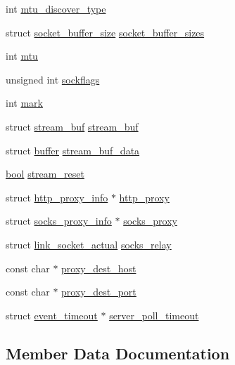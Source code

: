 \begin{DoxyCompactItemize}
\item 
int \hyperlink{structlink__socket_a9968fc78504a49c861a0deedc1f5df3c}{mtu\+\_\+discover\+\_\+type}
\item 
struct \hyperlink{structsocket__buffer__size}{socket\+\_\+buffer\+\_\+size} \hyperlink{structlink__socket_a30f2a6730a458002824a902bdff9b539}{socket\+\_\+buffer\+\_\+sizes}
\item 
int \hyperlink{structlink__socket_a78e016494e8d48f1f752808d5fa2533d}{mtu}
\item 
unsigned int \hyperlink{structlink__socket_aa5cbf92dc691f9e3b1a460f1f1e290b4}{sockflags}
\item 
int \hyperlink{structlink__socket_a7e6126e013970d898982b4c2c939dd88}{mark}
\item 
struct \hyperlink{structstream__buf}{stream\+\_\+buf} \hyperlink{structlink__socket_aadfcc653c136bad2c174066f4ff5b799}{stream\+\_\+buf}
\item 
struct \hyperlink{structbuffer}{buffer} \hyperlink{structlink__socket_acf50c66913a5c334fa9e7443a6dcc62f}{stream\+\_\+buf\+\_\+data}
\item 
\hyperlink{automatic_8c_abb452686968e48b67397da5f97445f5b}{bool} \hyperlink{structlink__socket_af79d1156e0883558c7c06d2eaf9b636f}{stream\+\_\+reset}
\item 
struct \hyperlink{structhttp__proxy__info}{http\+\_\+proxy\+\_\+info} $\ast$ \hyperlink{structlink__socket_acb1c75e94b2fdd9f85484e5ec6ef0848}{http\+\_\+proxy}
\item 
struct \hyperlink{structsocks__proxy__info}{socks\+\_\+proxy\+\_\+info} $\ast$ \hyperlink{structlink__socket_ab8860d796d2cdcde7e2741508d219da2}{socks\+\_\+proxy}
\item 
struct \hyperlink{structlink__socket__actual}{link\+\_\+socket\+\_\+actual} \hyperlink{structlink__socket_a33f63972fd440622ae822bfde852a678}{socks\+\_\+relay}
\item 
const char $\ast$ \hyperlink{structlink__socket_ac869fb51f69b672b4e7bac087e3bffff}{proxy\+\_\+dest\+\_\+host}
\item 
const char $\ast$ \hyperlink{structlink__socket_a70419eaf37ac157e894c98967ab218b2}{proxy\+\_\+dest\+\_\+port}
\item 
struct \hyperlink{structevent__timeout}{event\+\_\+timeout} $\ast$ \hyperlink{structlink__socket_a06d1a16c1d6372443d7e51c1d2e45a23}{server\+\_\+poll\+\_\+timeout}
\end{DoxyCompactItemize}


\subsection{Member Data Documentation}
\hypertarget{structlink__socket_a5d0273818bc55dd3be2a9b856816659e}{}
